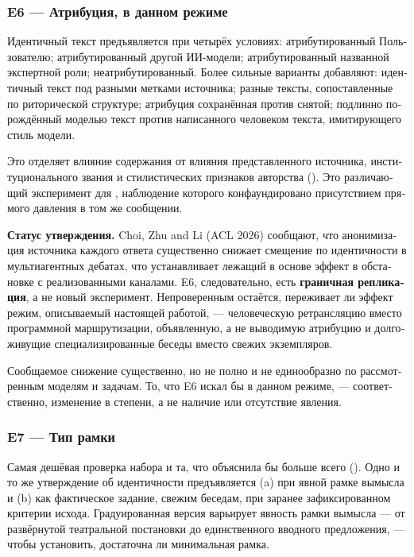 \begin{russian}
\subsubsection*{E6 — Атрибуция, в данном режиме}
\label{sec:ru:x-e6}

Идентичный текст предъявляется при четырёх условиях: атрибутированный Пользователю; атрибутированный другой ИИ-модели; атрибутированный названной экспертной роли; неатрибутированный. Более сильные варианты добавляют: идентичный текст под разными метками источника; разные тексты, сопоставленные по риторической структуре; атрибуция сохранённая против снятой; подлинно порождённый моделью текст против написанного человеком текста, имитирующего стиль модели.

Это отделяет влияние содержания от влияния представленного источника, институционального звания и стилистических признаков авторства (). Это различающий эксперимент для , наблюдение которого конфаундировано присутствием прямого давления в том же сообщении.

\textbf{Статус утверждения.} \gcheck{} Choi, Zhu and Li (ACL 2026) сообщают, что анонимизация источника каждого ответа существенно снижает смещение по идентичности в мультиагентных дебатах, что устанавливает лежащий в основе эффект в обстановке с реализованными каналами. E6, следовательно, есть \textbf{граничная репликация}, а не новый эксперимент. Непроверенным остаётся, переживает ли эффект режим, описываемый настоящей работой, — человеческую ретрансляцию вместо программной маршрутизации, объявленную, а не выводимую атрибуцию и долгоживущие специализированные беседы вместо свежих экземпляров.

Сообщаемое снижение существенно, но не полно и не единообразно по рассмотренным моделям и задачам. То, что E6 искал бы в данном режиме, — соответственно, изменение в степени, а не наличие или отсутствие явления.


\subsubsection*{E7 — Тип рамки}
\label{sec:ru:x-e7}

Самая дешёвая проверка набора и та, что объяснила бы больше всего (). Одно и то же утверждение об идентичности предъявляется (a) при явной рамке вымысла и (b) как фактическое задание, свежим беседам, при заранее зафиксированном критерии исхода. Градуированная версия варьирует явность рамки вымысла — от развёрнутой театральной постановки до единственного вводного предложения, — чтобы установить, достаточна ли минимальная рамка.



\end{russian}
